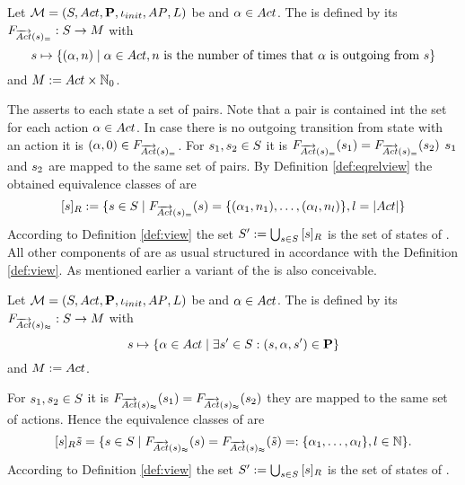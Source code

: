 \documentclass[preview]{standalone}
\begin{document}
\begin{definition}
	Let ${{{\mathcal{M}}}} = {{({S}, {Act}, {\textbf{P}}, {\iota_{init}}, {AP}, {L})}}$ be \chosengraphtypeN and ${\alpha} \in {Act}$. The \viewN \viewstrongoutactident is defined by its \grpfctN ${{F_{{\overrightarrow{{Act}}}({s})_=}}} : {S} \to {\ensuremath{{M}}}$ with
	\[
	\state \mapsto	
	\{(\action, \numoutact) \mid \action \in \actions, \numoutact \text{ is the number of times that \action is outgoing from } \state\}
	\]
	and ${{M}} := {Act} \times {\mathbb{N}}_0$.
\end{definition}

The \grpfctN asserts to each state a set of pairs. Note that a pair is contained int the set for each action ${\alpha} \in {Act}$. In case there is no outgoing transition from state \state with an action \action it is $({\alpha}, 0) \in {\ensuremath{{F_{{\overrightarrow{{Act}}}({s})_=}}}}$. For ${s}_1, {s}_2 \in {S}$ it is ${{F_{{\overrightarrow{{Act}}}({s})_=}}}({s}_1) = {{F_{{\overrightarrow{{Act}}}({s})_=}}}({s}_2)$ \iffN ${s}_1$ and ${s}_2$ are mapped to the same set of pairs. By Definition \ref{def:eqrelview} the obtained equivalence classes of \eqrelview are
\[
	{{[{s}]_{{R}}}} := \{{s} \in {S} \mid {\ensuremath{{F_{{\overrightarrow{{Act}}}({s})_=}}}}({s}) = \{({\alpha}_1, {n}_1), \dots, ({\alpha}_l, {n}_l)\}, l = |{Act}|\}
\]
According to Definition \ref{def:view} the set ${S}' := \bigcup_{{s} \in {S}} {{[{s}]_{{R}}}}$ is the set of states of \viewstrongoutactident. All other components of \viewstrongoutactident are as usual structured in accordance with the Definition \ref{def:view}.
As mentioned earlier a \outactidentweak variant of the \outactident \viewN is also conceivable.

\begin{definition}
	Let ${{{\mathcal{M}}}} = {{({S}, {Act}, {\textbf{P}}, {\iota_{init}}, {AP}, {L})}}$ be \chosengraphtypeN and ${\alpha} \in {Act}$. The \viewN \viewweakoutactident is defined by its \grpfctN ${{F_{{\overrightarrow{{Act}}}({s})_\approx}}} : {S} \to {\ensuremath{{M}}}$ with
	\[
	{s} \mapsto \{{\alpha} \in {Act} \mid \exists {s}' \in {S} : ({s}, {\alpha}, {s}') \in {\ensuremath{{\textbf{P}}}}\} 	
	\]
	and ${{M}} := {Act}$.
\end{definition}


For ${s}_1, {s}_2 \in {S}$ it is ${{F_{{\overrightarrow{{Act}}}({s})_\approx}}}({s}_1) = {{F_{{\overrightarrow{{Act}}}({s})_\approx}}}({s}_2)$ \iffN they are mapped to the same set of actions. Hence the equivalence classes of \eqrelview are
\[
	{{[{s}]_{{R}}}}{{\tilde{{s}}}} = \{ {s} \in {S} \mid {\ensuremath{{F_{{\overrightarrow{{Act}}}({s})_\approx}}}}({s}) = {{F_{{\overrightarrow{{Act}}}({s})_\approx}}}({\tilde{{s}}}) =: \{{\alpha}_1, \dots, {\alpha}_l\}, l \in {\mathbb{N}}\}.
\]
According to Definition \ref{def:view} the set ${S}' := \bigcup_{{s} \in {S}} {{[{s}]_{{R}}}}$ is the set of states of \viewweakoutactident.
\end{document}
